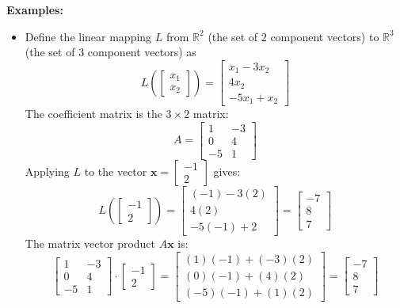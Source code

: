 \documentclass{article}
\begin{document}
\textbf{Examples:}
\begin{itemize}
\item Define the linear mapping \(L\) from \(\mathbb{R}^2\) (the set of \(2\) component vectors) to \(\mathbb{R}^3\) (the set of \(3\) component vectors) as 
\[L\left(\begin{bmatrix} x_1 \\ x_2 \end{bmatrix}\right) = \begin{bmatrix} x_1 - 3x_2 \\ 4x_2 \\ -5x_1 + x_2 \end{bmatrix}\]
The coefficient matrix is the \(3 \times 2\) matrix:
\[A = \begin{bmatrix} 1 & -3 \\ 0 & 4 \\ -5 & 1 \end{bmatrix}\]
Applying \(L\) to the vector \(\mathbf{x} = \begin{bmatrix} -1 \\ 2 \end{bmatrix}\) gives:
\[L\left(\begin{bmatrix} -1 \\ 2 \end{bmatrix}\right) = \begin{bmatrix} (-1) - 3(2) \\ 4(2) \\ -5(-1) + 2 \end{bmatrix} = \begin{bmatrix} -7 \\ 8 \\ 7 \end{bmatrix}\]
The matrix vector product \(A\mathbf{x}\) is:
\[\begin{bmatrix} 1 & -3 \\ 0 & 4 \\ -5 & 1 \end{bmatrix} \cdot \begin{bmatrix} -1 \\ 2 \end{bmatrix} = \begin{bmatrix} (1)(-1) + (-3)(2) \\ (0)(-1) + (4)(2) \\ (-5)(-1) + (1)(2) \end{bmatrix} = \begin{bmatrix} -7 \\ 8 \\ 7 \end{bmatrix}\]

\end{itemize}
\end{document}
